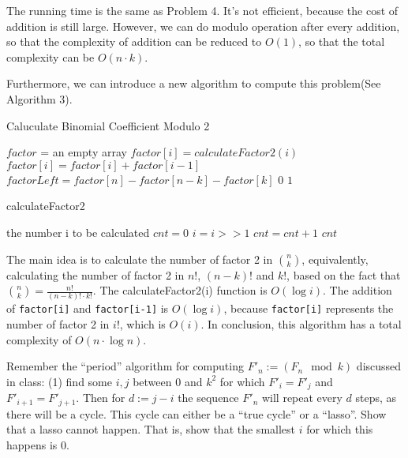 \documentclass[UTF8, a4paper, linespread=1.5]{article}
\begin{document}
The running time is the same as Problem 4. It's not efficient, because the cost of addition is still large. However, we can do modulo operation after every addition, so that the complexity of addition can be reduced to $O(1)$, so that the total complexity can be $O(n\cdot k)$. 

Furthermore, we can introduce a new algorithm to compute this problem(See Algorithm 3).
\begin{algorithm}
	\caption{Caluculate Binomial Coefficient Modulo 2}
	\begin{algorithmic}
		\STATE $factor$ = an empty array
		\STATE $factor[i]= calculateFactor2(i)$
		\ENDFOR
		\STATE $factor[i]= factor[i]+factor[i-1]$
		\ENDFOR
		\STATE $factorLeft=factor[n]-factor[n-k]-factor[k]$
		\RETURN $0$
		\ELSE 
		\RETURN $1$
		\ENDIF
	\end{algorithmic}
\end{algorithm}
\begin{algorithm}
	\caption{calculateFactor2}
	\begin{algorithmic}
		\REQUIRE 
		the number i to be calculated 
		\IF {$i==0$}
		\RETURN 0
		\ENDIF
		\STATE $cnt=0$
		\WHILE {the lowest bit in $i$ is 0}
		\STATE $i=i>>1$
		\STATE $cnt=cnt+1$
		\ENDWHILE
		\RETURN $cnt$
	\end{algorithmic}
\end{algorithm}

The main idea is to calculate the number of factor 2 in $\binom{n}{k}$, equivalently, calculating the number of factor 2 in $ n!$, $(n-k)!$ and $k!$, based on the fact that $\binom{n}{k} = \frac{n!}{(n-k)!\cdot k!}$. The calculateFactor2(i) function is $O(\log i)$. The addition of \texttt{factor[i]} and \texttt{factor[i-1]} is $O(\log i)$, because \texttt{factor[i]} represents the number of factor 2 in $i!$, which is $O(i)$. In conclusion, this algorithm has a total complexity of $O(n\cdot \log n)$.
\newpage
\begin{thm}{}{}
    Remember the ``period'' algorithm for computing $F'_n := (F_n \mod k)$ discussed in class: (1) find some $i,j$ between $0$ and $k^2$ for which $F'_{i} =  F'_{j}$ and $F'_{i+1} = F'_{j+1}$. Then for $d := j-i$ the sequence $F'_{n}$ will repeat every $d$ steps, as there will be a cycle. This cycle can either be a ``true cycle'' or a ``lasso''. Show that a lasso cannot happen. That is, show that the smallest $i$ for which this happens is $0$.
\end{thm}
\end{document}
